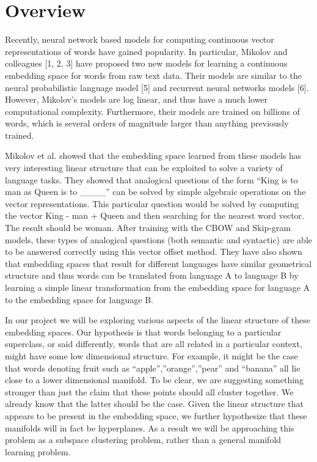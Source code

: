 \section{Overview}

Recently, neural network based models for computing continuous vector representations of words have gained popularity. 
In particular, Mikolov and colleagues [1, 2, 3] have proposed two new models for learning a continuous embedding space for words from raw text data. 
Their models are similar to the neural probabilistic language model [5] and recurrent neural networks models [6]. 
However, Mikolov’s models are log linear, and thus have a much lower computational complexity. 
Furthermore, their models are trained on billions of words, which is several orders of magnitude larger than anything previously trained.
 
Mikolov et al. showed that the embedding space learned from these models has very interesting linear structure that can be exploited to solve a variety of language tasks. 
They showed that analogical questions of the form “King is to man as Queen is to \_\_\_\_” can be solved by simple algebraic operations on the vector representations. 
This particular question would be solved by computing the vector King - man + Queen and then searching for the nearest word vector. 
The result should be woman. 
After training with the CBOW and Skip-gram models, these types of analogical questions (both semantic and syntactic) are able to be answered correctly using this vector offset method. 
They have also shown that embedding spaces that result for different languages have similar geometrical structure and thus words can be translated from language A to language B by learning a simple linear transformation from the embedding space for language A to the embedding space for language B.
 
In our project we will be exploring various aspects of the linear structure of these embedding spaces. 
Our hypothesis is that words belonging to a particular superclass, or said differently, words that are all related in a particular context, might have some low dimensional structure. 
For example, it might be the case that words denoting fruit such as “apple”,”orange”,”pear” and “banana” all lie close to a lower dimensional manifold. 
To be clear, we are suggesting something stronger than just the claim that these points should all cluster together. 
We already know that the latter should be the case. 
Given the linear structure that appears to be present in the embedding space, we further hypothesize that these manifolds will in fact be hyperplanes. 
As a result we will be approaching this problem as a subspace clustering problem, rather than a general manifold learning problem.
